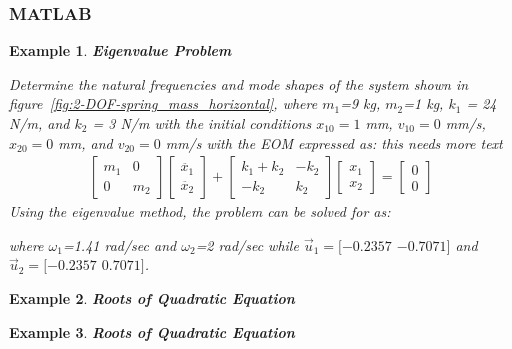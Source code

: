 \documentclass[12pt,letter]{article}
\newtheorem{ex}{Example}
\numberwithin{ex}{section} %
\newenvironment{example}{\begin{mdframed}[middlelinewidth=0.5mm]\begin{ex}\normalfont}{\end{ex}\end{mdframed}}
\numberwithin{re}{section} %
\newcommand{\rd}[1]{\textcolor[rgb]{0.75,0.00,0.00}{#1}}
\begin{document}
\subsubsection{MATLAB}

\begin{example}
\textbf{Eigenvalue Problem}

Determine the natural frequencies and mode shapes of the system shown in figure~\ref{fig:2-DOF-spring_mass_horizontal}, where $m_1$=9 kg, $m_2$=1 kg, $k_1$ = 24 N/m, and $k_2$ = 3 N/m with the initial conditions $x_{10}=1$ mm, $v_{10}=0$ mm/s, $x_{20}=0$ mm, and $v_{20}=0$ mm/s with the EOM expressed as: \rd{this needs more text}
\begin{eqnarray}
  \begin{bmatrix} m_1 & 0  \\  0 & m_2 \end{bmatrix}\begin{bmatrix} \ddot{x_1} \\  \ddot{x_2} \end{bmatrix} + \begin{bmatrix} k_1+k_2 & -k_2  \\  -k_2 & k_2 \end{bmatrix}\begin{bmatrix} x_1 \\  x_2 \end{bmatrix} = \begin{bmatrix} 0 \\  0 \end{bmatrix}
\end{eqnarray}
Using the eigenvalue method, the problem can be solved for as:

where $\omega_1$=1.41 rad/sec and  $\omega_2$=2 rad/sec while $\vec{u}_1 = [-0.2357$ $-0.7071]$ and $\vec{u}_2 = [-0.2357$ $0.7071]$.

\end{example}


\begin{example}
\textbf{Roots of Quadratic Equation}

\end{example}


\begin{example}
\textbf{Roots of Quadratic Equation}


\end{example}
\end{document}
